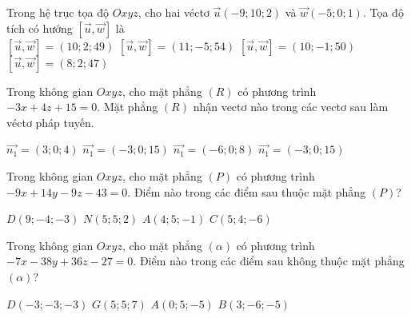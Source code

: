 \documentclass[12pt,a4paper]{article}
\begin{document}
\begin{ex}
 Trong hệ trục tọa độ ${Oxyz}$, cho hai véctơ $\overrightarrow{u}(-9;10;2)$ và $\overrightarrow{w}(-5;0;1)$. Tọa độ tích có hướng $\left[\overrightarrow{u},\overrightarrow{w}\right]$ là\\ 
\choice
{ $\left[\overrightarrow{u},\overrightarrow{w}\right]=(10;2;49)$ }
   { $\left[\overrightarrow{u},\overrightarrow{w}\right]=(11;-5;54)$ }
     { \True $\left[\overrightarrow{u},\overrightarrow{w}\right]= (10;-1;50)$ }
    { $\left[\overrightarrow{u},\overrightarrow{w}\right]=(8;2;47)$ }
\end{ex}

\begin{ex}
 Trong không gian ${Oxyz}$, cho mặt phẳng ${(R)}$ có phương trình $- 3 x + 4 z + 15=0$. Mặt phẳng ${(R)}$ nhận vectơ nào trong các vectơ sau làm véctơ pháp tuyến.
 
\choice
{ $\overrightarrow{n_1}=(3;0;4)$ }
   { $\overrightarrow{n_1}=(-3;0;15)$ }
     { \True $\overrightarrow{n_1}=(-6;0;8)$ }
    { $\overrightarrow{n_1}=(-3;0;15)$ }
\end{ex}

\begin{ex}
 Trong không gian ${Oxyz}$, cho mặt phẳng ${(P)}$ có phương trình $- 9 x + 14 y - 9 z - 43=0$. Điểm nào trong các điểm sau thuộc mặt phẳng ${(P)}$?
 
\choice
{ $D(9;-4;-3)$ }
   { $N(5;5;2)$ }
     { \True $A(4;5;-1)$ }
    { $C(5;4;-6)$ }
\end{ex}

\begin{ex}
 Trong không gian ${Oxyz}$, cho mặt phẳng ${(\alpha)}$ có phương trình $- 7 x - 38 y + 36 z - 27=0$. Điểm nào trong các điểm sau không thuộc mặt phẳng ${(\alpha)}$?
 
\choice
{ $D(-3;-3;-3)$ }
   { $G(5;5;7)$ }
     { \True $A(0;5;-5)$ }
    { $B(3;-6;-5)$ }
\end{ex}
\end{document}
